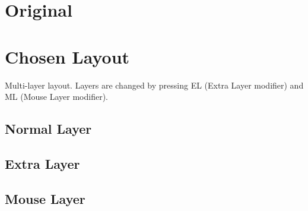\documentclass[a4paper,english]{article}
\begin{document}
\unitlength 0.0075cm

\section*{Original}


\section*{Chosen Layout}

Multi-layer layout.  Layers are changed by pressing \textsf{EL} (Extra Layer
modifier) and \textsf{ML} (Mouse Layer modifier).

\subsection*{Normal Layer}


\subsection*{Extra Layer}


\subsection*{Mouse Layer}

\end{document}
